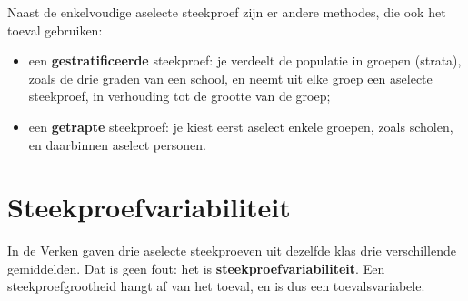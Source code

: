 Naast de enkelvoudige aselecte steekproef zijn er andere methodes, die ook het toeval gebruiken:

\begin{itemize}
\item een \textbf{gestratificeerde} steekproef: je verdeelt de populatie in groepen (strata), zoals de drie graden van een school, en neemt uit elke groep een aselecte steekproef, in verhouding tot de grootte van de groep;
\item een \textbf{getrapte} steekproef: je kiest eerst aselect enkele groepen, zoals scholen, en daarbinnen aselect personen.
\end{itemize}


\begin{oefeningen}

\end{oefeningen}

\section{Steekproefvariabiliteit}

In de Verken gaven drie aselecte steekproeven uit dezelfde klas drie verschillende gemiddelden. Dat is geen fout: het is \textbf{steekproefvariabiliteit}. Een steekproefgrootheid hangt af van het toeval, en is dus een toevalsvariabele.

